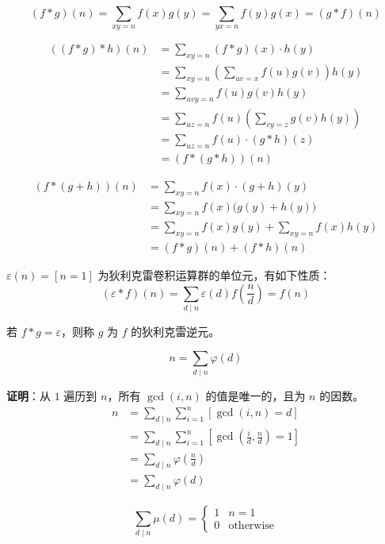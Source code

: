\[
(f * g)(n) = \sum_{xy=n} f(x)g(y) = \sum_{yx=n} f(y)g(x) = (g * f)(n)
\]

\[
\begin{aligned}
((f * g) * h)(n) 
&= \sum_{xy=n} (f * g)(x) \cdot h(y) \\
&= \sum_{xy=n} \left( \sum_{uv=x} f(u)g(v) \right) h(y) \\
&= \sum_{uvy=n} f(u)g(v)h(y) \\
&= \sum_{uz=n} f(u) \left( \sum_{vy=z} g(v)h(y) \right) \\
&= \sum_{uz=n} f(u) \cdot (g * h)(z) \\
&= (f * (g * h))(n)
\end{aligned}
\]

\[
\begin{aligned}
(f * (g + h))(n) 
&= \sum_{xy=n} f(x) \cdot (g + h)(y) \\
&= \sum_{xy=n} f(x) \bigl( g(y) + h(y) \bigr) \\
&= \sum_{xy=n} f(x)g(y) + \sum_{xy=n} f(x)h(y) \\
&= (f * g)(n) + (f * h)(n)
\end{aligned}
\]

$\varepsilon(n) = [n = 1]$ 为狄利克雷卷积运算群的单位元，有如下性质：
\[
(\varepsilon * f)(n) = \sum_{d \mid n} \varepsilon(d) f\!\left(\frac{n}{d}\right) = f(n)
\]

若 $f * g = \varepsilon$，则称 $g$ 为 $f$ 的狄利克雷逆元。


\[
n = \sum_{d \mid n} \varphi(d)
\]

\textbf{证明}：从 $1$ 遍历到 $n$，所有 $\gcd(i, n)$ 的值是唯一的，且为 $n$ 的因数。
\[
\begin{aligned}
n &= \sum_{d \mid n}\sum_{i=1}^{n} [\gcd(i, n) = d] \\
  &= \sum_{d \mid n}\sum_{i=1}^{n} \left[\gcd\!\left(\frac{i}{d}, \frac{n}{d}\right) = 1\right] \\
  &= \sum_{d \mid n} \varphi\!\left(\frac{n}{d}\right) \\
  &= \sum_{d \mid n} \varphi(d)
\end{aligned}
\]

\[
\sum_{d \mid n} \mu(d) = 
\begin{cases}
1 & n = 1 \\
0 & \text{otherwise}
\end{cases}
\]

